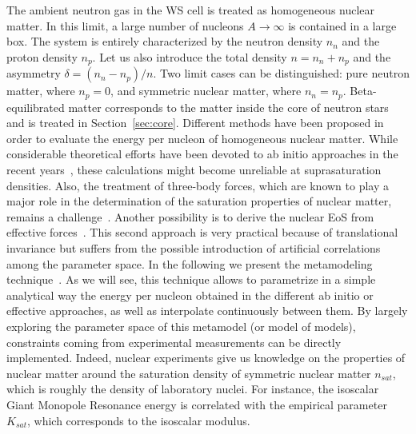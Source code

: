 The ambient neutron gas in the WS cell is treated as homogeneous nuclear
matter.
In this limit, a large number of nucleons $A\longrightarrow \infty$ is 
contained in a large box. The system is entirely characterized by the neutron 
density $n_n$ and the proton density $n_p$. Let us also introduce the total 
density $n = n_n + n_p$ and the asymmetry $\delta = (n_n - n_p)/n$.
Two limit cases can be distinguished: pure neutron matter, where $n_p=0$,
and symmetric nuclear matter, where $n_n = n_p$. Beta-equilibrated 
matter corresponds to the matter inside the core of neutron stars and is 
treated in Section~\ref{sec:core}. Different methods have been proposed in
order to evaluate the energy per nucleon of homogeneous nuclear matter. While 
considerable theoretical efforts have been devoted to ab initio
approaches in the recent years~\cite{Gandolfi2014}, these calculations might 
become unreliable at suprasaturation densities. Also, the treatment of 
three-body forces, which are known to play a major role in the determination of 
the saturation properties of nuclear matter, remains a
challenge~\cite{Drischler2016}. Another possibility is to derive the nuclear 
EoS from effective forces~\cite{Chabanat1998}. This second approach is very 
practical because of translational invariance but suffers from the possible 
introduction of artificial correlations among the parameter space. In the 
following we present the metamodeling 
technique~\cite{Margueron2018a,Margueron2018b}. As we will see, this technique
allows to parametrize in a simple analytical way the energy per nucleon
obtained in the different ab initio or effective approaches, as well as
interpolate continuously between them. By largely exploring the parameter space
of this metamodel (or model of models), constraints coming from experimental
measurements can be directly implemented. Indeed, nuclear experiments give us 
knowledge on the properties of nuclear
matter around the saturation density of symmetric nuclear matter $n_{sat}$,
which is roughly the density of laboratory nuclei. For
instance, the isoscalar Giant Monopole Resonance energy is correlated
with the empirical parameter $K_{sat}$, which corresponds to the isoscalar
modulus.
%

